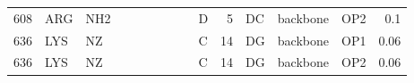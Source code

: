 \begin{longtable}{rlllrlllrlrlllr}
       608 & ARG        & NH2    &        &          &           &          &       &            & D         &           5 & DC           & backbone    & OP2      &          0.1  \\
       636 & LYS        & NZ     &        &          &           &          &       &            & C         &          14 & DG           & backbone    & OP1      &          0.06 \\
       636 & LYS        & NZ     &        &          &           &          &       &            & C         &          14 & DG           & backbone    & OP2      &          0.06 \\
\hline
\end{longtable}